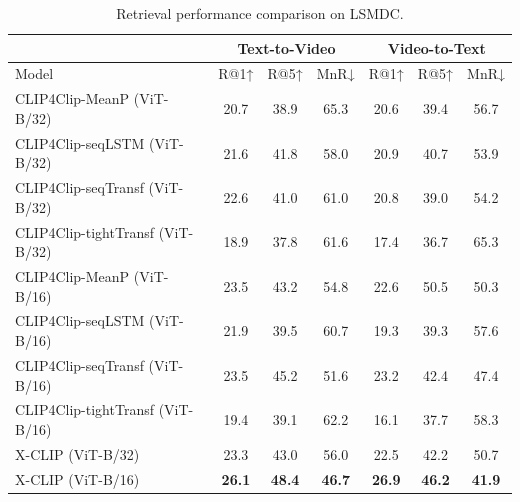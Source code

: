\documentclass[sigconf]{acmart}
\begin{document}
\begin{table}[]
\caption{Retrieval performance comparison on LSMDC.}
\begin{tabular}{l|ccc|ccc}
\hline
              & \multicolumn{3}{c|}{Text-to-Video}   & \multicolumn{3}{c}{Video-to-Text}   \\ \hline
Model         & R@1↑          & R@5↑          & MnR↓          & R@1↑          & R@5↑          & MnR↓          \\ \hline
CLIP4Clip-MeanP (ViT-B/32)  & 20.7          & 38.9          & 65.3          & 20.6          & 39.4          & 56.7          \\
 CLIP4Clip-seqLSTM (ViT-B/32)    & 21.6 & 41.8 & 58.0 & 20.9 & 40.7 & 53.9 \\
 CLIP4Clip-seqTransf (ViT-B/32)   & 22.6 & 41.0 & 61.0 & 20.8 & 39.0 & 54.2 \\
 CLIP4Clip-tightTransf (ViT-B/32)    & 18.9 & 37.8 & 61.6 & 17.4 & 36.7 & 65.3 \\
CLIP4Clip-MeanP (ViT-B/16)  & 23.5          & 43.2          & 54.8          & 22.6          & 50.5          & 50.3          \\ 
CLIP4Clip-seqLSTM (ViT-B/16)  & 21.9          & 39.5          & 60.7          & 19.3          & 39.3          & 57.6          \\ 
CLIP4Clip-seqTransf (ViT-B/16)  & 23.5          & 45.2          & 51.6          & 23.2          & 42.4          & 47.4          \\ 
CLIP4Clip-tightTransf (ViT-B/16)  & 19.4          & 39.1          & 62.2          & 16.1          & 37.7          & 58.3          \\ 
\hline
X-CLIP (ViT-B/32)    & 23.3          & 43.0          & 56.0          & 22.5          & 42.2          & 50.7          \\
X-CLIP (ViT-B/16)    & \textbf{26.1} & \textbf{48.4} & \textbf{46.7} & \textbf{26.9} & \textbf{46.2} & \textbf{41.9} \\ \hline
\end{tabular}
\label{tab:lsmdc_performance2}
\end{table}
\end{document}
